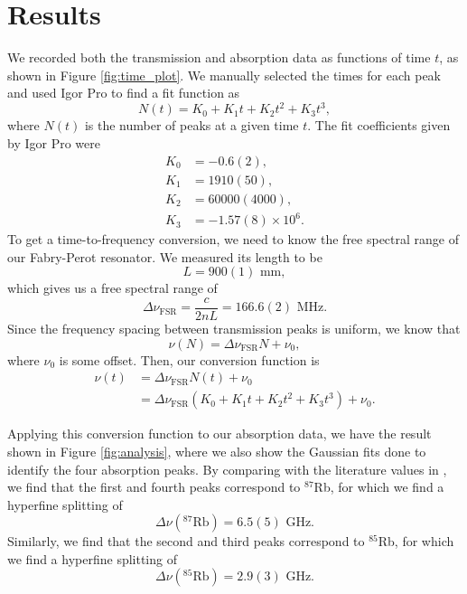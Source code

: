\documentclass{../paper}
\begin{document}
\section{Results}

We recorded both the transmission and absorption data as functions of time $t$, as shown in Figure \ref{fig:time_plot}. We manually selected the times for each peak and used Igor Pro to find a fit function as
\begin{equation}
  N(t) = K_0 + K_1 t + K_2 t^2 + K_3 t^3,
\end{equation}
where $N(t)$ is the number of peaks at a given time $t$. The fit coefficients given by Igor Pro were
\begin{align}
  K_0 &= -0.6(2), \\
  K_1 &= 1910(50), \\
  K_2 &= 60000(4000), \\
  K_3 &= -1.57(8) \times 10^6.
\end{align}
To get a time-to-frequency conversion, we need to know the free spectral range of our Fabry-Perot resonator. We measured its length to be
\begin{equation}
  L = 900(1) \text{ mm},
\end{equation}
which gives us a free spectral range of
\begin{equation}
  \Delta \nu_\text{FSR} = \frac{c}{2 n L} = 166.6(2) \text{ MHz}.
\end{equation}
Since the frequency spacing between transmission peaks is uniform, we know that
\begin{equation}
  \nu(N) = \Delta \nu_\text{FSR} N + \nu_0,
\end{equation}
where $\nu_0$ is some offset. Then, our conversion function is
\begin{align}
  \nu(t)
  &= \Delta \nu_\text{FSR} N(t) + \nu_0 \\
  &= \Delta \nu_\text{FSR} (K_0 + K_1 t + K_2 t^2 + K_3 t^3) + \nu_0.
\end{align}

Applying this conversion function to our absorption data, we have the result shown in Figure \ref{fig:analysis}, where we also show the Gaussian fits done to identify the four absorption peaks. By comparing with the literature values in \cite{RbData}, we find that the first and fourth peaks correspond to $^{87}$Rb, for which we find a hyperfine splitting of
\begin{equation}
  \Delta\nu(^{87}\text{Rb}) = 6.5(5) \text{ GHz}.
\end{equation}
Similarly, we find that the second and third peaks correspond to $^{85}$Rb, for which we find a hyperfine splitting of
\begin{equation}
  \Delta\nu(^{85}\text{Rb}) = 2.9(3) \text{ GHz}.
\end{equation}
\end{document}
